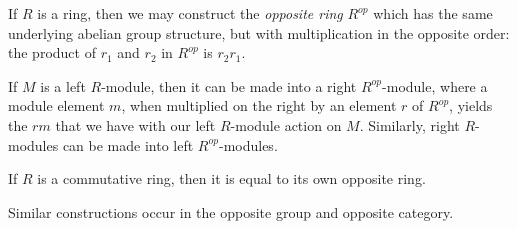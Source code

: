\documentclass[12pt]{article}
\begin{document}
If $R$ is a ring, then we may construct the {\it opposite ring} $R^{op}$ which has the same underlying abelian group structure, but with multiplication in the opposite order: the product of $r_1$ and $r_2$ in $R^{op}$ is $r_2 r_1$.
\par
If $M$ is a left $R$-module, then it can be made into a right $R^{op}$-module, where a module element $m$, when multiplied on the right by an element $r$ of $R^{op}$, yields the $rm$ that we have with our left $R$-module action on $M$.  Similarly, right $R$-modules can be made into left $R^{op}$-modules.
\par
If $R$ is a commutative ring, then it is equal to its own opposite ring.
\par
Similar constructions occur in the opposite group and opposite category.
\end{document}
